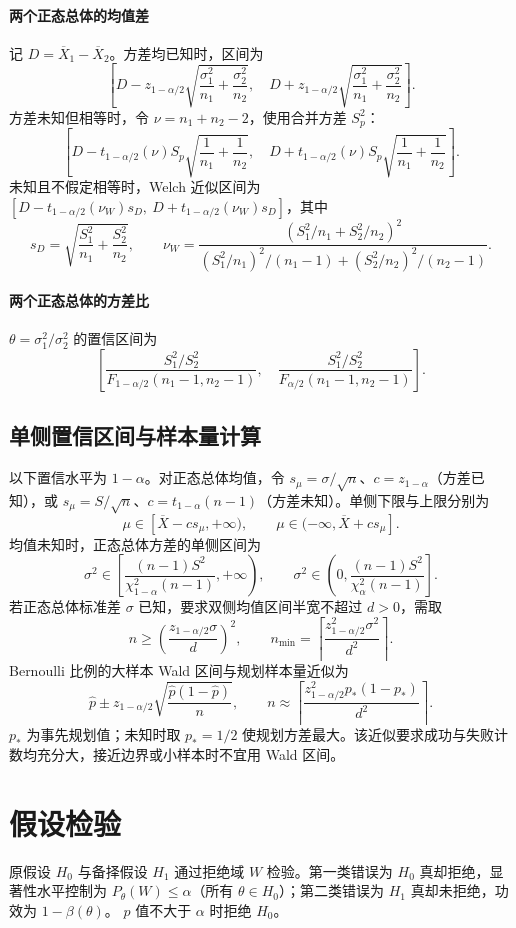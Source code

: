 \documentclass[../main.tex]{subfiles}
\begin{document}
\paragraph{两个正态总体的均值差}
记 $D=\overline X_1-\overline X_2$。方差均已知时，区间为
\[
\left[D-z_{1-\alpha/2}\sqrt{\frac{\sigma_1^2}{n_1}+\frac{\sigma_2^2}{n_2}},\quad
D+z_{1-\alpha/2}\sqrt{\frac{\sigma_1^2}{n_1}+\frac{\sigma_2^2}{n_2}}\right].
\]
方差未知但相等时，令 $\nu=n_1+n_2-2$，使用合并方差 $S_p^2$：
\[
\left[D-t_{1-\alpha/2}(\nu)S_p\sqrt{\frac1{n_1}+\frac1{n_2}},\quad
D+t_{1-\alpha/2}(\nu)S_p\sqrt{\frac1{n_1}+\frac1{n_2}}\right].
\]
未知且不假定相等时，Welch 近似区间为 $[D-t_{1-\alpha/2}(\nu_W)s_D,\ D+t_{1-\alpha/2}(\nu_W)s_D]$，其中
\[
s_D=\sqrt{\frac{S_1^2}{n_1}+\frac{S_2^2}{n_2}},\qquad
\nu_W=\frac{(S_1^2/n_1+S_2^2/n_2)^2}
{(S_1^2/n_1)^2/(n_1-1)+(S_2^2/n_2)^2/(n_2-1)}.
\]
\paragraph{两个正态总体的方差比}
$\theta=\sigma_1^2/\sigma_2^2$ 的置信区间为
\[
\left[\frac{S_1^2/S_2^2}{F_{1-\alpha/2}(n_1-1,n_2-1)},\quad
\frac{S_1^2/S_2^2}{F_{\alpha/2}(n_1-1,n_2-1)}\right].
\]
\subsection{单侧置信区间与样本量计算}
以下置信水平为 $1-\alpha$。对正态总体均值，令 $s_\mu=\sigma/\sqrt n$、$c=z_{1-\alpha}$（方差已知），或 $s_\mu=S/\sqrt n$、$c=t_{1-\alpha}(n-1)$（方差未知）。单侧下限与上限分别为
\[
\mu\in[\overline X-cs_\mu,+\infty),\qquad
\mu\in(-\infty,\overline X+cs_\mu].
\]
均值未知时，正态总体方差的单侧区间为
\[
\sigma^2\in\left[\frac{(n-1)S^2}{\chi^2_{1-\alpha}(n-1)},+\infty\right),\qquad
\sigma^2\in\left(0,\frac{(n-1)S^2}{\chi^2_\alpha(n-1)}\right].
\]
若正态总体标准差 $\sigma$ 已知，要求双侧均值区间半宽不超过 $d>0$，需取
\[
n\ge\left(\frac{z_{1-\alpha/2}\sigma}{d}\right)^2,
\qquad n_{\min}=\left\lceil\frac{z_{1-\alpha/2}^2\sigma^2}{d^2}\right\rceil.
\]
Bernoulli 比例的大样本 Wald 区间与规划样本量近似为
\[
\widehat p\pm z_{1-\alpha/2}\sqrt{\frac{\widehat p(1-\widehat p)}n},\qquad
n\approx\left\lceil\frac{z_{1-\alpha/2}^2p_*(1-p_*)}{d^2}\right\rceil.
\]
$p_*$ 为事先规划值；未知时取 $p_*=1/2$ 使规划方差最大。该近似要求成功与失败计数均充分大，接近边界或小样本时不宜用 Wald 区间。
\section{假设检验}
原假设 $H_0$ 与备择假设 $H_1$ 通过拒绝域 $W$ 检验。第一类错误为 $H_0$ 真却拒绝，显著性水平控制为 $P_\theta(W)\le\alpha$（所有 $\theta\in H_0$）；第二类错误为 $H_1$ 真却未拒绝，功效为 $1-\beta(\theta)$。
$p$ 值不大于 $\alpha$ 时拒绝 $H_0$。
\end{document}
